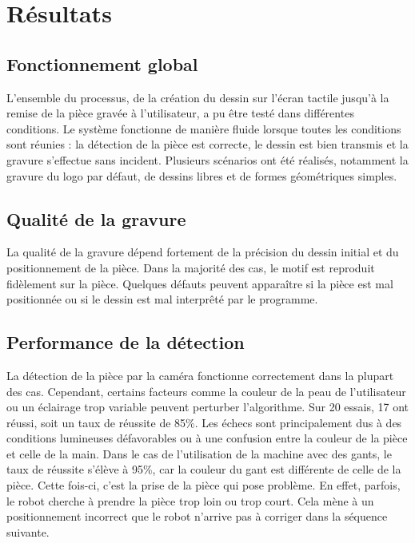\chapter{Résultats}

\section{Fonctionnement global}

L'ensemble du processus, de la création du dessin sur l'écran tactile jusqu'à la remise de la pièce gravée à l'utilisateur, a pu être testé dans différentes conditions. Le système fonctionne de manière fluide lorsque toutes les conditions sont réunies : la détection de la pièce est correcte, le dessin est bien transmis et la gravure s'effectue sans incident. Plusieurs scénarios ont été réalisés, notamment la gravure du logo par défaut, de dessins libres et de formes géométriques simples.

\section{Qualité de la gravure}

La qualité de la gravure dépend fortement de la précision du dessin initial et du positionnement de la pièce. Dans la majorité des cas, le motif est reproduit fidèlement sur la pièce. Quelques défauts peuvent apparaître si la pièce est mal positionnée ou si le dessin est mal interprêté par le programme.


\section{Performance de la détection}

La détection de la pièce par la caméra fonctionne correctement dans la plupart des cas. Cependant, certains facteurs comme la couleur de la peau de l'utilisateur ou un éclairage trop variable peuvent perturber l'algorithme. Sur 20 essais, 17 ont réussi, soit un taux de réussite de 85\%. Les échecs sont principalement dus à des conditions lumineuses défavorables ou à une confusion entre la couleur de la pièce et celle de la main.
Dans le cas de l'utilisation de la machine avec des gants, le taux de réussite s'élève à 95\%, car la couleur du gant est différente de celle de la pièce. Cette fois-ci, c'est la prise de la pièce qui pose problème. En effet, parfois, le robot cherche à prendre la pièce trop loin ou trop court. Cela mène à un positionnement incorrect que le robot n'arrive pas à corriger dans la séquence suivante.

